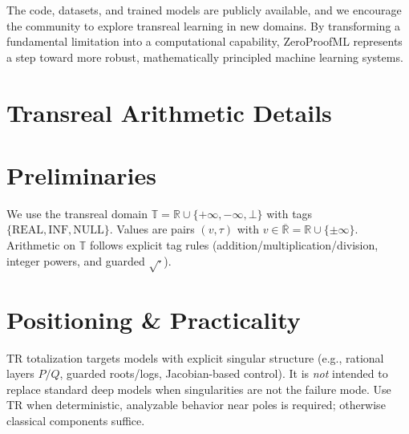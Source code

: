 \documentclass[twoside,11pt]{article}
\begin{document}
The code, datasets, and trained models are publicly available, and we encourage the community to explore transreal learning in new domains. By transforming a fundamental limitation into a computational capability, ZeroProofML represents a step toward more robust, mathematically principled machine learning systems.





\appendix
\section{Transreal Arithmetic Details}\label{app:transreal}
\begingroup
\small

\section*{Preliminaries}
\label{sec:prelim}
We use the transreal domain \(\mathbb{T}=\mathbb{R}\cup\{+\infty,-\infty,\bot\}\) with tags \(\{\mathrm{REAL},\mathrm{INF},\mathrm{NULL}\}\). Values are pairs \((v,\tau)\) with \(v\in\overline{\mathbb{R}}=\mathbb{R}\cup\{\pm\infty\}\). Arithmetic on \(\mathbb{T}\) follows explicit tag rules (addition/multiplication/division, integer powers, and guarded \(\sqrt{\cdot}\)).

\section*{Positioning \& Practicality}
\label{sec:positioning}
TR totalization targets models with explicit singular structure (e.g., rational layers \(P/Q\), guarded roots/logs, Jacobian-based control). It is \emph{not} intended to replace standard deep models when singularities are not the failure mode. Use TR when deterministic, analyzable behavior near poles is required; otherwise classical components suffice.

\end{document}
